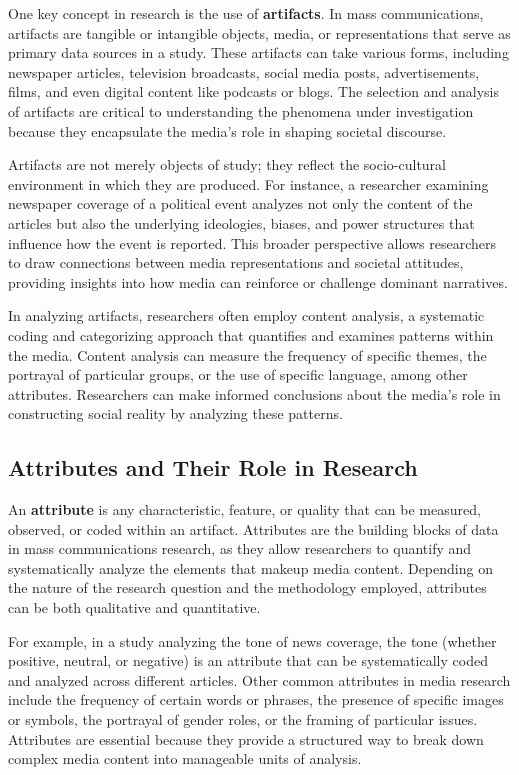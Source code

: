 \documentclass[
]{book}
\begin{document}
One key concept in research is the use of \textbf{artifacts}. In mass communications, artifacts are tangible or intangible objects, media, or representations that serve as primary data sources in a study. These artifacts can take various forms, including newspaper articles, television broadcasts, social media posts, advertisements, films, and even digital content like podcasts or blogs. The selection and analysis of artifacts are critical to understanding the phenomena under investigation because they encapsulate the media's role in shaping societal discourse.

Artifacts are not merely objects of study; they reflect the socio-cultural environment in which they are produced. For instance, a researcher examining newspaper coverage of a political event analyzes not only the content of the articles but also the underlying ideologies, biases, and power structures that influence how the event is reported. This broader perspective allows researchers to draw connections between media representations and societal attitudes, providing insights into how media can reinforce or challenge dominant narratives.

In analyzing artifacts, researchers often employ content analysis, a systematic coding and categorizing approach that quantifies and examines patterns within the media. Content analysis can measure the frequency of specific themes, the portrayal of particular groups, or the use of specific language, among other attributes. Researchers can make informed conclusions about the media's role in constructing social reality by analyzing these patterns.

\subsection*{Attributes and Their Role in Research}\label{attributes-and-their-role-in-research}

An \textbf{attribute} is any characteristic, feature, or quality that can be measured, observed, or coded within an artifact. Attributes are the building blocks of data in mass communications research, as they allow researchers to quantify and systematically analyze the elements that makeup media content. Depending on the nature of the research question and the methodology employed, attributes can be both qualitative and quantitative.

For example, in a study analyzing the tone of news coverage, the tone (whether positive, neutral, or negative) is an attribute that can be systematically coded and analyzed across different articles. Other common attributes in media research include the frequency of certain words or phrases, the presence of specific images or symbols, the portrayal of gender roles, or the framing of particular issues. Attributes are essential because they provide a structured way to break down complex media content into manageable units of analysis.
\end{document}
